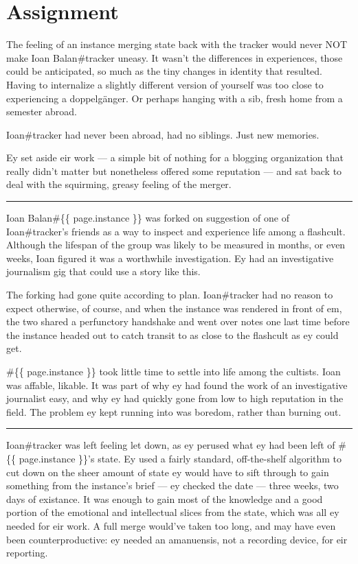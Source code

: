 \chapter{Assignment}

The feeling of an instance merging state back with the tracker would never NOT make Ioan Balan\#tracker uneasy. It wasn't the differences in experiences, those could be anticipated, so much as the tiny changes in identity that resulted. Having to internalize a slightly different version of yourself was too close to experiencing a doppelgänger. Or perhaps hanging with a sib, fresh home from a semester abroad.

Ioan\#tracker had never been abroad, had no siblings. Just new memories.

Ey set aside eir work --- a simple bit of nothing for a blogging organization that really didn't matter but nonetheless offered some reputation --- and sat back to deal with the squirming, greasy feeling of the merger.

\begin{center}\rule{0.5\linewidth}{\linethickness}\end{center}

Ioan Balan\#\{\{ page.instance \}\} was forked on suggestion of one of Ioan\#tracker's friends as a way to inspect and experience life among a flashcult. Although the lifespan of the group was likely to be measured in months, or even weeks, Ioan figured it was a worthwhile investigation. Ey had an investigative journalism gig that could use a story like this.

The forking had gone quite according to plan. Ioan\#tracker had no reason to expect otherwise, of course, and when the instance was rendered in front of em, the two shared a perfunctory handshake and went over notes one last time before the instance headed out to catch transit to as close to the flashcult as ey could get.

\#\{\{ page.instance \}\} took little time to settle into life among the cultists. Ioan was affable, likable. It was part of why ey had found the work of an investigative journalist easy, and why ey had quickly gone from low to high reputation in the field. The problem ey kept running into was boredom, rather than burning out.

\begin{center}\rule{0.5\linewidth}{\linethickness}\end{center}

Ioan\#tracker was left feeling let down, as ey perused what ey had been left of \#\{\{ page.instance \}\}'s state. Ey used a fairly standard, off-the-shelf algorithm to cut down on the sheer amount of state ey would have to sift through to gain something from the instance's brief --- ey checked the date --- three weeks, two days of existance. It was enough to gain most of the knowledge and a good portion of the emotional and intellectual slices from the state, which was all ey needed for eir work. A full merge would've taken too long, and may have even been counterproductive: ey needed an amanuensis, not a recording device, for eir reporting.

